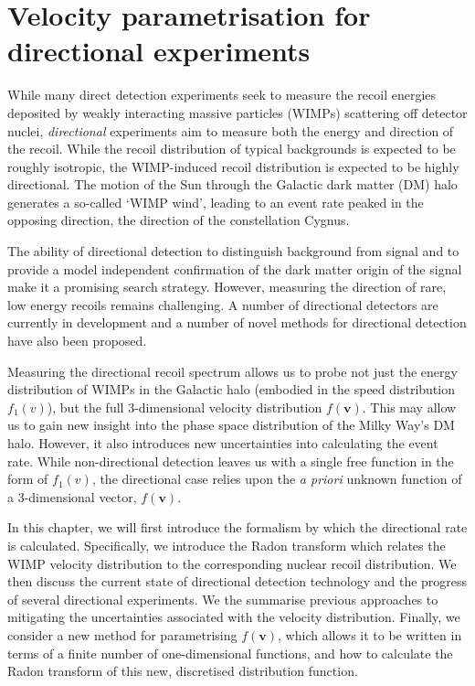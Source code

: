 \chapter[Directional detection]{Velocity parametrisation for directional experiments}
\label{ch:directional}

While many direct detection experiments seek to measure the recoil energies deposited by weakly interacting massive particles (WIMPs) scattering off detector nuclei, \textit{directional} experiments aim to measure both the energy and direction of the recoil. While the recoil distribution of typical backgrounds is expected to be roughly isotropic, the WIMP-induced recoil distribution is expected to be highly directional. The motion of the Sun through the Galactic dark matter (DM) halo generates a so-called `WIMP wind', leading to an event rate peaked in the opposing direction, the direction of the constellation Cygnus. 

The ability of directional detection to distinguish background from signal and to provide a model independent confirmation of the dark matter origin of the signal make it a promising search strategy. However, measuring the direction of rare, low energy recoils remains challenging. A number of directional detectors are currently in development and a number of novel methods for directional detection have also been proposed.

Measuring the directional recoil spectrum allows us to probe not just the energy distribution of WIMPs in the Galactic halo (embodied in the speed distribution $f_1(v)$), but the full 3-dimensional velocity distribution $f(\textbf{v})$. This may allow us to gain new insight into the phase space distribution of the Milky Way's DM halo. However, it also introduces new uncertainties into calculating the event rate. While non-directional detection leaves us with a single free function in the form of $f_1(v)$, the directional case relies upon the \textit{a priori} unknown function of a 3-dimensional vector, $f(\textbf{v})$.

In this chapter, we will first introduce the formalism by which the directional rate is calculated. Specifically, we introduce the Radon transform which relates the WIMP velocity distribution to the corresponding nuclear recoil distribution.  We then discuss the current state of directional detection technology and the progress of several directional experiments. We the summarise previous approaches to mitigating the uncertainties associated with the velocity distribution. Finally, we consider a new method for parametrising $f(\textbf{v})$, which allows it to be written in terms of a finite number of one-dimensional functions, and how to calculate the Radon transform of this new, discretised distribution function.

